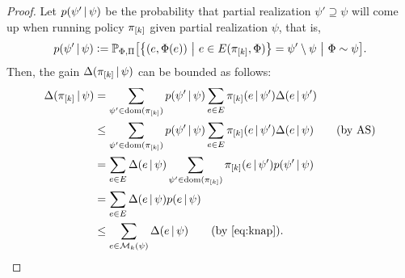 \begin{proof}
  Let $p(\psi'\,\vert\,\psi)$ be the probability that partial realization $\psi' \supseteq \psi$ will come up when running policy $\pi_{[k]}$ given partial realization $\psi$, that is,
  \begin{align*}
    p(\psi'\mmid\psi) \defeq \P[\Phi, \Pi]{\sdef{\left(e, \Phi(e)\right)}{e \in E(\pik, \Phi)} = \psi'\setminus\psi}[\Phi \sim \psi].
  \end{align*}
  Then, the gain $\Delta(\pi_{[k]}\,\vert\,\psi)$ can be bounded as follows:
  \begin{align*}
    \D{\pik}{\psi} &= \sum_{\psi' \in \dom(\pik)}p(\psi'\mmid\psi)\sum_{e \in E}\pik(e\mmid\psi')\D{e}{\psi'}\\
    &\leq \sum_{\psi' \in \dom(\pik)}p(\psi'\mmid\psi)\sum_{e \in E}\pik(e\mmid\psi')\D{e}{\psi} \tag*{(by AS)}\\
    &= \sum_{e \in E}\D{e}{\psi} \sum_{\psi' \in \dom(\pik)}\pik(e\mmid\psi')p(\psi'\mmid\psi)\\
    &= \sum_{e \in E}\D{e}{\psi} p(e\mmid\psi)\\
    &\leq \sum_{e \in \mathcal{M}_k(\psi)} \D{e}{\psi} \tag*{(by \eqref{eq:knap})}.
  \end{align*}
\end{proof}

